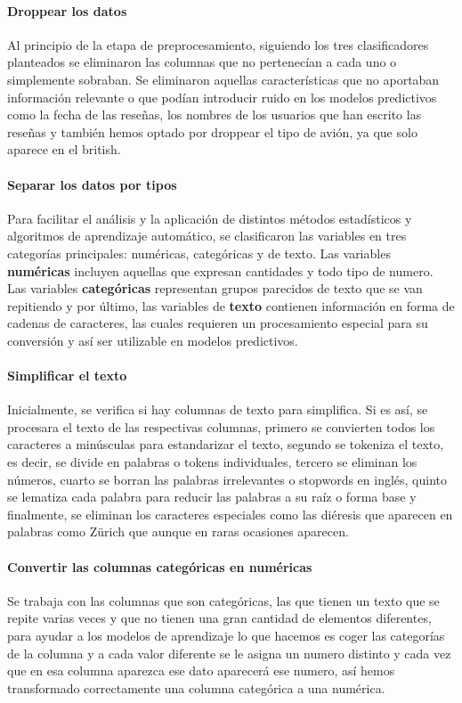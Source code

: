 \documentclass{report}
\begin{document}
                \paragraph*{Droppear los datos} {
                     Al principio de la etapa de preprocesamiento, siguiendo los tres clasificadores planteados se eliminaron las columnas que no pertenecían a cada uno o simplemente sobraban. Se eliminaron aquellas características que no aportaban información relevante o que podían introducir ruido en los modelos predictivos como la fecha de las reseñas, los nombres de los usuarios que han escrito las reseñas y también hemos optado por droppear el tipo de avión, ya que solo aparece en el british.}
                \paragraph*{Separar los datos por tipos} {
                    Para facilitar el análisis y la aplicación de distintos métodos estadísticos y algoritmos de aprendizaje automático, se clasificaron las variables en tres categorías principales: numéricas, categóricas y de texto. Las variables \textbf{numéricas} incluyen aquellas que expresan cantidades y todo tipo de numero. Las variables \textbf{categóricas} representan grupos parecidos de texto que se van repitiendo y por último, las variables de \textbf{texto} contienen información en forma de cadenas de caracteres, las cuales requieren un procesamiento especial para su conversión y así ser utilizable en modelos predictivos. }
                \paragraph*{Simplificar el texto} {
                    Inicialmente, se verifica si hay columnas de texto para simplifica. Si es así, se procesara el texto de las respectivas columnas, primero se convierten todos los caracteres a minúsculas para estandarizar el texto, segundo se tokeniza el texto, es decir, se divide en palabras o tokens individuales, tercero se eliminan los números, cuarto se borran las palabras irrelevantes o stopwords en inglés, quinto se lematiza cada palabra para reducir las palabras a su raíz o forma base y finalmente, se eliminan los caracteres especiales como las diéresis que aparecen en palabras como Zürich que aunque en raras ocasiones aparecen. }
                \paragraph*{Convertir las columnas categóricas en numéricas} {
                    Se trabaja con las columnas que son categóricas, las que tienen un texto que se repite varias veces y que no tienen una gran cantidad de elementos diferentes, para ayudar a los modelos de aprendizaje lo que hacemos es coger las categorías de la columna y a cada valor diferente se le asigna un numero distinto y cada vez que en esa columna aparezca ese dato aparecerá ese numero, así hemos transformado correctamente una columna categórica a una numérica.}
\end{document}
